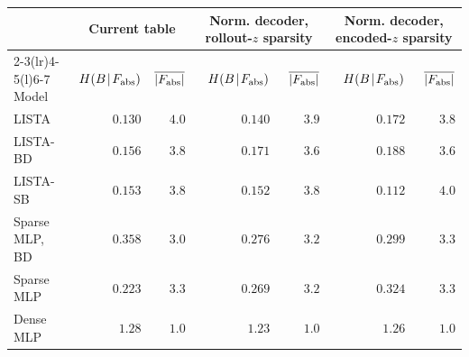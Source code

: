 \begin{tabular}[t]{@{}l rr rr rr@{}}
\toprule
& \multicolumn{2}{c}{Current table} & \multicolumn{2}{c}{Norm. decoder, rollout-\(z\) sparsity} & \multicolumn{2}{c}{Norm. decoder, encoded-\(z\) sparsity} \\
\cmidrule(lr){2-3}\cmidrule(lr){4-5}\cmidrule(l){6-7}
Model & $H(B\!\mid\!F_{\rm abs})$ & $\overline{|F_{\rm abs}|}$ & $H(B\!\mid\!F_{\rm abs})$ & $\overline{|F_{\rm abs}|}$ & $H(B\!\mid\!F_{\rm abs})$ & $\overline{|F_{\rm abs}|}$ \\
\midrule
LISTA & $0.130$ & $4.0$ & $0.140$ & $3.9$ & $0.172$ & $3.8$ \\
LISTA-BD & $0.156$ & $3.8$ & $0.171$ & $3.6$ & $0.188$ & $3.6$ \\
LISTA-SB & $0.153$ & $3.8$ & $0.152$ & $3.8$ & $0.112$ & $4.0$ \\
Sparse MLP, BD & $0.358$ & $3.0$ & $0.276$ & $3.2$ & $0.299$ & $3.3$ \\
Sparse MLP & $0.223$ & $3.3$ & $0.269$ & $3.2$ & $0.324$ & $3.3$ \\
\midrule
Dense MLP & $1.28$ & $1.0$ & $1.23$ & $1.0$ & $1.26$ & $1.0$ \\
\bottomrule
\end{tabular}
